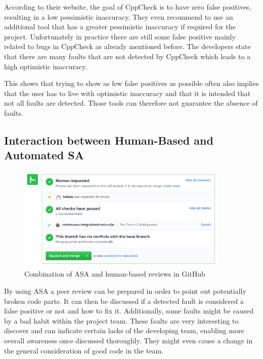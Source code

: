 \documentclass{scrartcl}
\begin{document}
According to their website, the goal of CppCheck is to have zero false positives, resulting in a low pessimistic inaccuracy. They even recommend to use an additional tool that has a greater pessimistic inaccuracy if required for the project. Unfortunately in practice there are still some false positive mainly related to bugs in CppCheck as already mentioned before. The developers state that there are many faults that are not detected by CppCheck which leads to a high optimistic inaccuracy.

This shows that trying to show as few false positives as possible often also implies that the user has to live with optimistic inaccuracy and that it is intended that not all faults are detected. Those tools can therefore not guarantee the absence of faults.

\subsection{Interaction between Human-Based and Automated SA}
\label{sec:humand-based-vs-automated-sa}

\begin{figure}[h]
	\centering
	\includegraphics[width=0.9\textwidth]{img/github_pr_review}
	\caption[GitHub PR review]{Combination of ASA and human-based reviews in GitHub}
	\label{fig:github_pr_review}
\end{figure}

By using ASA a peer review can be prepared in order to point out potentially broken code parts. It can then be discussed if a detected fault is considered a false positive or not and how to fix it. Additionally, some faults might be caused by a bad habit within the project team. These faults are very interesting to discover and can indicate certain lacks of the developing team, enabling more overall awareness once discussed thoroughly. They might even cause a change in the general consideration of good code in the team.  
\end{document}
